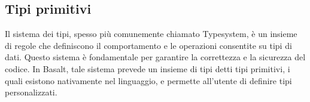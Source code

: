 \subsection{Tipi primitivi}
Il sistema dei tipi, spesso più comunemente chiamato Typesystem, è un insieme di regole che definiscono il comportamento e 
le operazioni consentite su tipi di dati. Questo sistema è fondamentale per garantire la correttezza e la sicurezza del 
codice. In Basalt, tale sistema prevede un insieme di tipi detti tipi primitivi, i quali esistono nativamente nel 
linguaggio, e permette all’utente di definire tipi personalizzati.


 \newpage
 \newpage
 \newpage
 \newpage
 \newpage